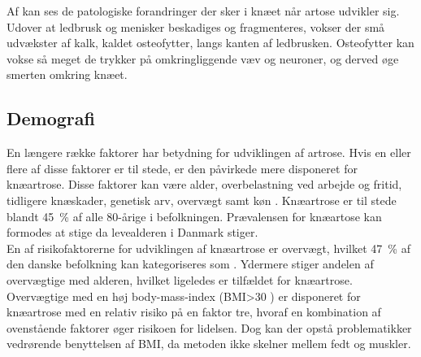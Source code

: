 Af  kan ses de patologiske forandringer der sker i knæet når artose udvikler sig. Udover at ledbrusk og menisker beskadiges og fragmenteres, vokser der små udvækster af kalk, kaldet osteofytter, langs kanten af ledbrusken. Osteofytter kan vokse så meget de trykker på omkringliggende væv og neuroner, og derved øge smerten omkring knæet.

\subsection{Demografi}
En længere række faktorer har betydning for udviklingen af artrose. Hvis en eller flere af disse faktorer er til stede, er den påvirkede mere disponeret for knæartrose. Disse faktorer kan være alder, overbelastning ved arbejde og fritid, tidligere knæskader, genetisk arv, overvægt samt køn \citep{brostrom2012}. Knæartrose er til stede blandt 45~\% af alle 80-årige i befolkningen. Prævalensen for knæartose kan formodes at stige da levealderen i Danmark stiger. \\
En af risikofaktorerne for udviklingen af knæartrose er overvægt, hvilket 47~\% af den danske befolkning kan kategoriseres som \citep{Vestergaard2016}. Ydermere stiger andelen af overvægtige med alderen, hvilket ligeledes er tilfældet for knæartrose. Overvægtige med en høj body-mass-index (BMI>30 \citep{definitionfedme1999}) er disponeret for knæartrose med en relativ risiko på en faktor tre, hvoraf en kombination af ovenstående faktorer øger risikoen for lidelsen. Dog kan der opstå problematikker vedrørende benyttelsen af BMI, da metoden ikke skelner mellem fedt og muskler. \citep{brostrom2012} \citep{Lind2016b}





